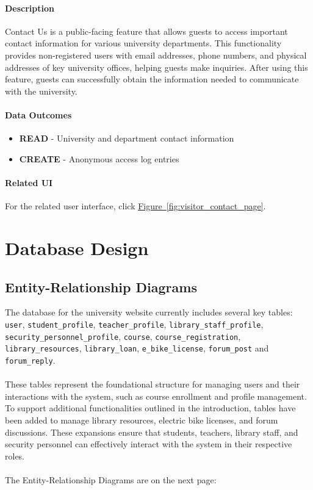 \documentclass[12pt]{article}
\begin{document}
\paragraph{Description}
Contact Us is a public-facing feature that allows guests to access important contact information for various university departments. This functionality provides non-registered users with email addresses, phone numbers, and physical addresses of key university offices, helping guests make inquiries. After using this feature, guests can successfully obtain the information needed to communicate with the university.

\paragraph{Data Outcomes}
\begin{itemize}
    \item \textbf{READ} - University and department contact information
    \item \textbf{CREATE} - Anonymous access log entries
\end{itemize}

\paragraph{Related UI}
For the related user interface, click \hyperref[fig:visitor_contact_page]{Figure~\ref*{fig:visitor_contact_page}}.


\newpage
\section{Database Design}

\subsection{Entity-Relationship Diagrams}
The database for the university website currently includes several key tables: \texttt{user}, 
\texttt{student\_profile}, \texttt{teacher\_profile}, \texttt{library\_staff\_profile}, 
\texttt{security\_personnel\_profile}, \texttt{course}, \texttt{course\_registration}, \texttt{library\_resources}, 
\texttt{library\_loan}, \texttt{e\_bike\_license}, \texttt{forum\_post} and \texttt{forum\_reply}.\\ \\ 
These tables represent the foundational structure for managing users and their interactions with the system, 
such as course enrollment and profile management. To support additional functionalities outlined in the introduction, 
tables have been added to manage library resources, electric bike licenses, and forum discussions. 
These expansions ensure that students, teachers, library staff, and security personnel can effectively interact 
with the system in their respective roles. \\ \\ 
The Entity-Relationship Diagrams are on the next page:
\end{document}
